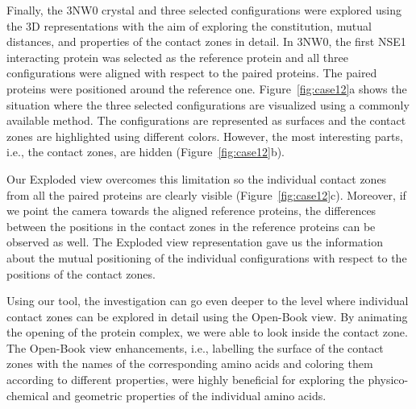 \documentclass{bmcart}
\def\OpBook {Open-Book view\xspace}
\def\ExpView {Exploded view\xspace}
\begin{document}

Finally, the 3NW0 crystal and three selected configurations were explored using the 3D representations with the aim of exploring the constitution, mutual distances, and properties of the contact zones in detail.
In 3NW0, the first NSE1 interacting protein was selected as the reference protein and all three configurations were aligned with respect to the paired proteins.
The paired proteins were positioned around the reference one.
Figure~\ref{fig:case12}a shows the situation where the three selected configurations are visualized using a commonly available method.
The configurations are represented as surfaces and the contact zones are highlighted using different colors.
However, the most interesting parts, i.e., the contact zones, are hidden (Figure~\ref{fig:case12}b).

Our \ExpView overcomes this limitation so the individual contact zones from all the paired proteins are clearly visible (Figure~\ref{fig:case12}c).
Moreover, if we point the camera towards the aligned reference proteins, the differences between the positions in the contact zones in the reference proteins can be observed as well.
The \ExpView representation gave us the information about the mutual positioning of the individual configurations with respect to the positions of the contact zones.

Using our tool, the investigation can go even deeper to the level where individual contact zones can be explored in detail using the \OpBook.
By animating the opening of the protein complex, we were able to look inside the contact zone.
The \OpBook enhancements, i.e., labelling the surface of the contact zones with the names of the corresponding amino acids and coloring them according to different properties, were highly beneficial for exploring the physico-chemical and geometric properties of the individual amino acids.%
\end{document}
